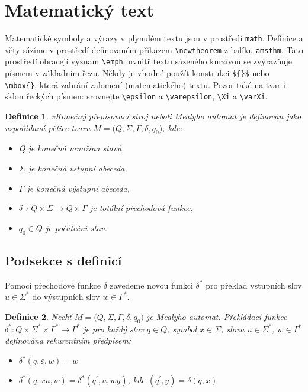 \documentclass[11pt, a4paper, twocolumn]{article}
\begin{document}
\section{Matematický text}
Matematické symboly a výrazy v plynulém textu jsou
v prostředí \texttt{math}. Definice a věty sázíme v prostředí
definovaném příkazem \verb|\newtheorem| z balíku \texttt{amsthm}.
Tato prostředí obracejí význam \verb|\emph|: uvnitř textu
sázeného kurzívou se zvýrazňuje písmem v základním řezu. Někdy je vhodné použít konstrukci \verb|${}$|
nebo \verb|\mbox{}|, která zabrání zalomení (matematického) textu. Pozor také na tvar i sklon řeckých písmen:
srovnejte \verb|\epsilon| a \verb|\varepsilon|, \verb|\Xi| a \verb|\varXi|.
\newtheorem{defn}{Definice}
\begin{defn}\label{def:definice1}
v\emph{Konečný přepisovací stroj} neboli \emph{Mealyho automat} je definován jako uspořádaná pětice tvaru $M = \mathrm{(}Q,\varSigma,\varGamma,\delta,q_0\mathrm{)}$, kde:
\begin{itemize}
    \item[$\bullet$] Q je konečná množina \emph{stavů},
    \item[$\bullet$] $\varSigma$ je konečná \emph{vstupní abeceda},
    \item[$\bullet$] $\varGamma$ je konečná \emph{výstupní abeceda},
    \item[$\bullet$] $\delta$ \emph{:} $Q \times \varSigma \rightarrow Q \times \varGamma$ je totální \emph{přechodová funkce},
    \item[$\bullet$] $q_0 \in Q$ je \emph{počáteční stav}.
\end{itemize}
\end{defn}
\subsection{Podsekce s definicí}
Pomocí přechodové funkce $\delta$ zavedeme novou funkci $\delta^\ast$
pro překlad vstupních slov $u \in \Sigma^\ast$ do výstupních slov $w \in \Gamma^\ast$.
\begin{defn}
Nechť $M = \mathrm{(}Q, \varSigma, \varGamma, \delta, q_0\mathrm{)}$ je Mealyho automat. \emph{Překládací funkce} $\delta^\ast : Q \times \varSigma^\ast \times \varGamma^\ast \rightarrow \varGamma^\ast$ je pro každý stav $q \in Q$, symbol $x \in \varSigma$, slova $u \in \varSigma^\ast$, $w \in \varGamma^\ast$ definována rekurentním předpisem:
\begin{itemize}
    \item[$\bullet$] $\delta^\ast(q, \varepsilon, w) = w$
    \item[$\bullet$] $\delta^\ast(q, xu, w) = \delta^\ast(q^\prime, u, wy)$, kde $(q^\prime, y) = \delta(q,x)$
\end{itemize}
\end{defn}
\end{document}

